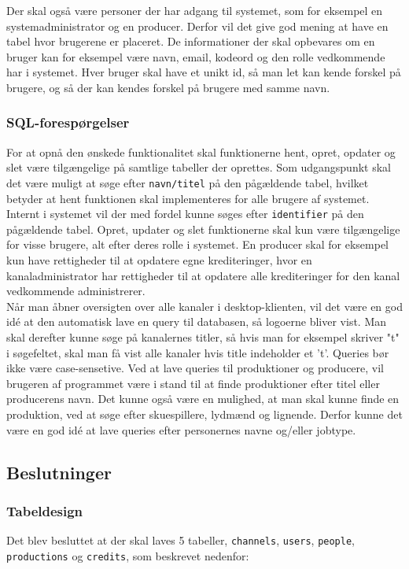 \noindent
Der skal også være personer der har adgang til systemet, som for eksempel en systemadministrator og en producer. Derfor vil det give god mening at have en tabel hvor brugerene er placeret. De informationer der skal opbevares om en bruger kan for eksempel være navn, email, kodeord og den rolle vedkommende har i systemet. Hver bruger skal have et unikt id, så man let kan kende forskel på brugere, og så der kan kendes forskel på brugere med samme navn.

\subsubsection{SQL-forespørgelser}
For at opnå den ønskede funktionalitet skal funktionerne hent, opret, opdater og slet være tilgængelige på samtlige tabeller der oprettes. Som udgangspunkt skal det være muligt at søge efter \texttt{navn/titel} på den pågældende tabel, hvilket betyder at hent funktionen skal implementeres for alle brugere af systemet. Internt i systemet vil der med fordel kunne søges efter \texttt{identifier} på den pågældende tabel. Opret, updater og slet funktionerne skal kun være tilgængelige for visse brugere, alt efter deres rolle i systemet. En producer skal for eksempel kun have rettigheder til at opdatere egne krediteringer, hvor en kanaladministrator har rettigheder til at opdatere alle krediteringer for den kanal vedkommende administrerer. \\

\noindent
Når man åbner oversigten over alle kanaler i desktop-klienten, vil det være en god idé at den automatisk lave en query til databasen, så logoerne bliver vist. Man skal derefter kunne søge på kanalernes titler, så hvis man for eksempel skriver "t" i søgefeltet, skal man få vist alle kanaler hvis title indeholder et 't'. Queries bør ikke være case-sensetive. Ved at lave queries til produktioner og producere, vil brugeren af programmet være i stand til at finde produktioner efter titel eller producerens navn. Det kunne også være en mulighed, at man skal kunne finde en produktion, ved at søge efter skuespillere, lydmænd og lignende. Derfor kunne det være en god idé at lave queries efter personernes navne og/eller jobtype.

\subsection{Beslutninger}
\subsubsection{Tabeldesign}
\noindent
Det blev besluttet at der skal laves 5 tabeller, \texttt{channels}, \texttt{users}, \texttt{people}, \texttt{productions} og \texttt{credits}, som beskrevet nedenfor:\\

